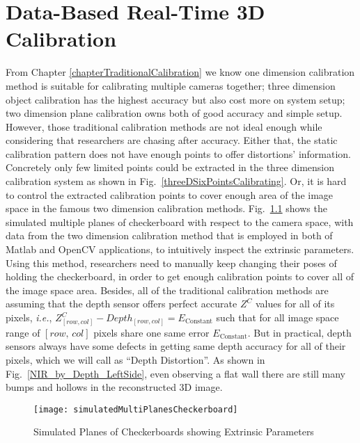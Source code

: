 \chapter{Data-Based Real-Time 3D Calibration} %
\label{chapterDataBasedCalibration} 
\indent From Chapter \ref{chapterTraditionalCalibration} we know one dimension calibration method is suitable for calibrating multiple cameras together; three dimension object calibration has the highest accuracy but also cost more on system setup; two dimension plane calibration owns both of good accuracy and simple setup. However, those traditional calibration methods are not ideal enough while considering that researchers are chasing after accuracy. Either that, the static calibration pattern does not have enough points to offer distortions' information. Concretely only few limited points could be extracted in the three dimension calibration system as shown in Fig.~\ref{threeDSixPointsCalibrating}. Or, it is hard to control the extracted calibration points to cover enough area of the image space in the famous two dimension calibration methods. Fig.~\ref{simulatedMultiPlanesCheckerboard} shows the simulated multiple planes of checkerboard with respect to the camera space, with data from the two dimension calibration method that is employed in both of Matlab and OpenCV applications, to intuitively inspect the extrinsic parameters. Using this method, researchers need to manually keep changing their poses of holding the checkerboard, in order to get enough calibration points to cover all of the image space area. Besides, all of the traditional calibration methods are assuming that the depth sensor offers perfect accurate \(Z^C\) values for all of its pixels, \textit{i.e.}, \(Z^C_{[row, col]} - Depth_{[row, col]} = E_{\text{Constant}}\) such that for all image space range of \([row,\, col]\) pixels  share one same error \(E_{\text{Constant}}\). But in practical, depth sensors always have some defects in getting same depth accuracy for all of their pixels, which we will call as \enquote{Depth Distortion}. As shown in Fig.~\ref{NIR_by_Depth_LeftSide}, even observing a flat wall there are still many bumps and hollows in the reconstructed 3D image.
%
 \begin{figure}[b]
\centering
\texttt{[image: simulatedMultiPlanesCheckerboard]}
\caption{Simulated Planes of Checkerboards showing Extrinsic Parameters}
\label{simulatedMultiPlanesCheckerboard}
\end{figure}%
